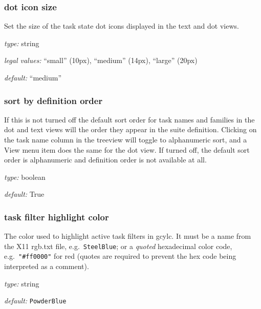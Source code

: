 \subsubsection{dot icon size}

Set the size of the task state dot icons displayed in the text and dot
views.

\begin{myitemize}
\item {\em type:} string
\item {\em legal values:} ``small'' (10px), ``medium'' (14px), ``large'' (20px)
\item {\em default:} ``medium''
\end{myitemize}

\subsubsection{sort by definition order}

If this is not turned off the default sort order for task names and
families in the dot and text views will the order they appear in the
suite definition. Clicking on the task name column in the treeview will
toggle to alphanumeric sort, and a View menu item does the same for the
dot view.  If turned off, the default sort order is alphanumeric and
definition order is not available at all.

\begin{myitemize}
\item {\em type:} boolean
\item {\em default:} True
\end{myitemize}

\subsubsection{task filter highlight color}

The color used to highlight active task filters in gcylc. It must be a name
from the X11 rgb.txt file, e.g.\ \lstinline=SteelBlue=; or a
{\em quoted} hexadecimal color code, e.g.\ \lstinline="#ff0000"= for red (quotes
are required to prevent the hex code being interpreted as a comment).

\begin{myitemize}
    \item {\em type:} string
    \item {\em default:} \lstinline=PowderBlue=
\end{myitemize}

